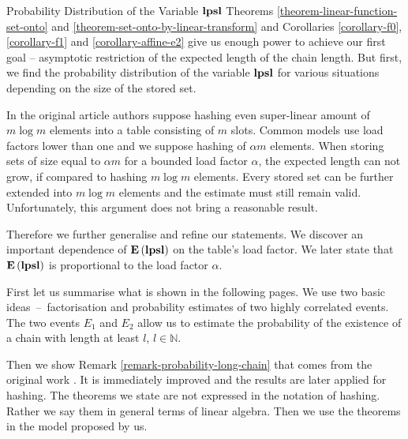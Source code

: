 \begin{section}{Probability Distribution of the Variable \texorpdfstring{$\mathbf{lpsl}$}{lpsl}}
\label{section-linear-transformations-distribution}
Theorems \ref{theorem-linear-function-set-onto} and \ref{theorem-set-onto-by-linear-transform} and Corollaries \ref{corollary-f0}, \ref{corollary-f1} and \ref{corollary-affine-e2} give us enough power to achieve our first goal -- asymptotic restriction of the expected length of the chain length. But first, we find the probability distribution of the variable $\mathbf{lpsl}$ for various situations depending on the size of the stored set. 

In the original article \cite{DBLP:journals/jacm/AlonDMPT99} authors suppose hashing even super-linear amount of $m \log m$ elements into a table consisting of $m$ slots. Common models use load factors lower than one and we suppose hashing of $\alpha m$ elements. When storing sets of size equal to $\alpha m$ for a bounded load factor $\alpha$, the expected length can not grow, if compared to hashing $m \log m$ elements. Every stored set can be further extended into $m \log m$ elements and the estimate must still remain valid. Unfortunately, this argument does not bring a reasonable result.

Therefore we further generalise and refine our statements. We discover an important dependence of $\mathbf{E}\left(\mathbf{lpsl}\right)$ on the table's load factor. We later state that $\mathbf{E}\left(\mathbf{lpsl}\right)$ is proportional to the load factor $\alpha$.

First let us summarise what is shown in the following pages. We use two basic ideas~--~factorisation and probability estimates of two highly correlated events. The two events $E_1$ and $E_2$ allow us to estimate the probability of the existence of a chain with length at least $l$, $l \in \mathbb{N}$. 

Then we show Remark \ref{remark-probability-long-chain} that comes from the original work \cite{DBLP:journals/jacm/AlonDMPT99}. It is immediately improved and the results are later applied for hashing. The theorems we state are not expressed in the notation of hashing. Rather we say them in general terms of linear algebra. Then we use the theorems in the model proposed by us. 


\end{section}
